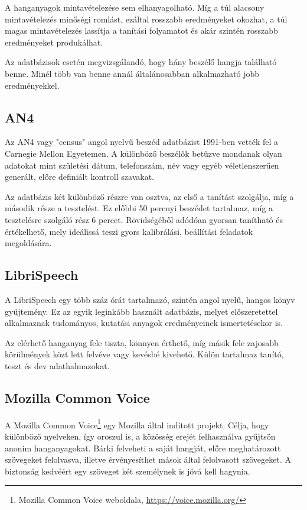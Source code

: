 A hanganyagok mintavételezése sem elhanyagolható. Míg a túl alacsony mintavételezés minőségi romlást, ezáltal rosszabb eredményeket okozhat, a túl magas mintavételezés lassítja a tanítási folyamatot és akár szintén rosszabb eredményeket produkálhat.

Az adatbázisok esetén megvizsgálandó, hogy hány beszélő hangja található benne. Minél több van benne annál általánosabban alkalmazható jobb eredményekkel.

\subsection{AN4}

Az AN4\cite{an4} vagy "census" angol nyelvű beszéd adatbázist 1991-ben vették fel a Carnegie Mellon Egyetemen. A különböző beszélők betűzve mondanak olyan adatokat mint születési dátum, telefonszám, név vagy egyéb véletlenszerűen generált, előre definiált kontroll szavakat.


Az adatbázis két különböző részre van osztva, az első a tanítást szolgálja, míg a második része a tesztelést. Ez előbbi 50 percnyi beszédet tartalmaz, míg a tesztelésre szolgáló rész 6 percet. Rövidségéből adódóan gyorsan tanítható és értékelhető, mely ideálissá teszi gyors kalibrálási, beállítási feladatok megoldására.

\subsection{LibriSpeech}

A LibriSpeech egy több száz órát tartalmazó, szintén angol nyelű, hangos könyv gyűjtemény. Ez az egyik leginkább használt adatbázis, melyet előszeretettel alkalmaznak tudományos, kutatási anyagok eredményeinek ismertetésekor is.

Az elérhető hanganyag fele tiszta, könnyen érthető, míg másik fele zajosabb körülmények közt lett felvéve vagy kevésbé kivehető. Külön tartalmaz tanító, teszt és dev adathalmazokat.

\subsection{Mozilla Common Voice}

A Mozilla Common Voice\footnote{Mozilla Common Voice weboldala, \url{https://voice.mozilla.org/}} egy Mozilla által indított projekt. Célja, hogy különböző nyelveken, így oroszul is, a közösség erejét felhasználva gyűjtsön anonim hanganyagokat. Bárki felveheti a saját hangját, előre meghatározott szövegeket felolvasva, illetve érvényesíthet mások által felolvasott szövegeket. A biztonság kedvéért egy szöveget két személynek is jóvá kell hagynia.

